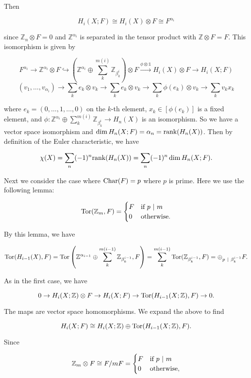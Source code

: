 \documentclass{article}
\newcommand{\Z}{\mathbb{Z}}
\newcommand{\identity}{\mathds{1}}
\newcommand{\Tor}{\textnormal{Tor}}
\newcommand{\Char}{\textnormal{Char}}
\begin{document}
Then

$$H_{i}(X; F)\cong H_{i}(X)\otimes F\cong F^{\alpha_{i}}$$

since $\Z_{n}\otimes F = 0$ and $\Z^{\alpha_{i}}$ is separated in the tensor product with $\Z\otimes F = F$. This isomorphism is given by

$$F^{\alpha_{i}}\to \Z^{\alpha_{i}}\otimes F\hookrightarrow \left(\Z^{\alpha_{i}}\oplus \sum_{k}^{m(i)} \Z_{\beta_{k}^{i}}\right)\otimes F\xrightarrow{\phi\otimes \identity} H_{i}(X)\otimes F\to H_{i}(X; F)$$
$$(v_{1},\ldots, v_{\alpha_{i}})\to \sum_{k}e_{k}\otimes v_{k}\to \sum_{k}e_{k}\otimes v_{k}\to \sum_{k}\phi(e_{k})\otimes v_{k}\to \sum_{k} v_{k}x_{k}$$

where $e_{k} = (0,\ldots, 1,\ldots, 0)$ on the $k$-th element, $x_{k}\in [\phi(e_{k})]$ is a fixed element, and $\phi: \Z^{\alpha_{i}}\oplus \sum_{k}^{m(i)}\Z_{\beta_{k}^{i}}\to H_{n}(X)$ is an isomorphism. So we have a vector space isomorphism and $\dim H_{n}(X; F) = \alpha_{n} = \textnormal{rank} (H_{n}(X))$. Then by definition of the Euler characteristic, we have

$$\chi(X) = \sum_{n}(-1)^{n}\textnormal{rank}(H_{n}(X)) = \sum_{n}(-1)^{n}\dim H_{n}(X; F).$$

Next we consider the case where $\Char(F) = p$ where $p$ is prime. Here we use the following lemma:

\[\Tor(\Z_{m}, F) = \begin{cases} F & \textnormal{if } p\ |\ m\\ 0 & \textnormal{otherwise}. \end{cases}\]

By this lemma, we have

$$\Tor(H_{i-1}(X), F) = \Tor\left(\Z^{\alpha_{i-1}}\oplus \sum_{k}^{m(i-1)}\Z_{\beta_{k}^{i-1}}, F\right) = \sum_{k}^{m(i-1)} \Tor(\Z_{\beta_{k}^{i-1}}, F) = \oplus_{p\ |\ \beta_{k}^{i-1}} F.$$

As in the first case, we have

$$0\to H_{i}(X; \Z)\otimes F\to H_{i}(X; F)\to \Tor(H_{i-1}(X; \Z), F)\to 0.$$

The maps are vector space homomorphisms. We expand the above to find

$$H_{i}(X; F)\cong H_{i}(X; \Z)\oplus \Tor(H_{i-1}(X; \Z), F).$$

Since

\[\Z_{m}\otimes F\cong F/mF = \begin{cases} F & \textnormal{if } p\ |\ m\\ 0 & \textnormal{otherwise}, \end{cases}\]
\end{document}
